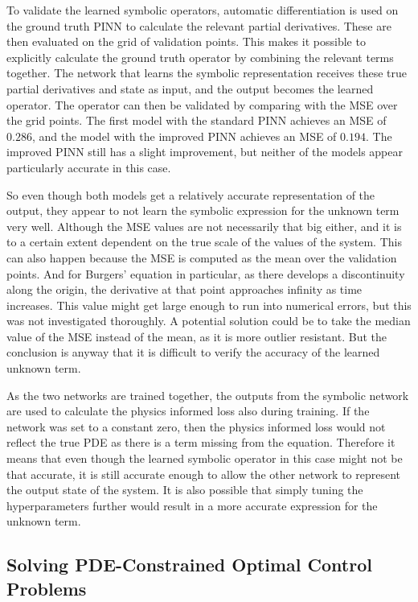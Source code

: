 To validate the learned symbolic operators, automatic differentiation is used on the ground truth PINN to calculate the relevant partial derivatives. These are then evaluated on the grid of validation points. This makes it possible to explicitly calculate the ground truth operator by combining the relevant terms together. The network that learns the symbolic representation receives these true partial derivatives and state as input, and the output becomes the learned operator. The operator can then be validated by comparing with the MSE over the grid points. The first model with the standard PINN achieves an MSE of $0.286$, and the model with the improved PINN achieves an MSE of $0.194$. The improved PINN still has a slight improvement, but neither of the models appear particularly accurate in this case.

So even though both models get a relatively accurate representation of the output, they appear to not learn the symbolic expression for the unknown term very well. Although the MSE values are not necessarily that big either, and it is to a certain extent dependent on the true scale of the values of the system. This can also happen because the MSE is computed as the mean over the validation points. And for Burgers' equation in particular, as there develops a discontinuity along the origin, the derivative at that point approaches infinity as time increases. This value might get large enough to run into numerical errors, but this was not investigated thoroughly. A potential solution could be to take the median value of the MSE instead of the mean, as it is more outlier resistant. But the conclusion is anyway that it is difficult to verify the accuracy of the learned unknown term.

As the two networks are trained together, the outputs from the symbolic network are used to calculate the physics informed loss also during training. If the network was set to a constant zero, then the physics informed loss would not reflect the true PDE as there is a term missing from the equation. Therefore it means that even though the learned symbolic operator in this case might not be that accurate, it is still accurate enough to allow the other network to represent the output state of the system. It is also possible that simply tuning the hyperparameters further would result in a more accurate expression for the unknown term.

\subsection{Solving PDE-Constrained Optimal Control Problems}

